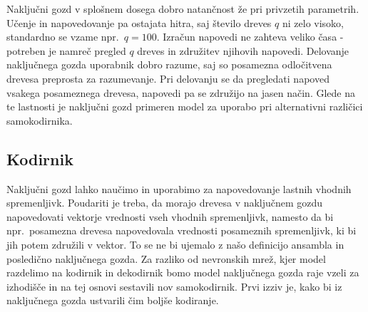 \documentclass[12pt,a4paper,twoside]{article}
\theoremstyle{definition} %
\theoremstyle{plain} %
\numberwithin{equation}{section}  %
\begin{document}


Naključni gozd v splošnem dosega dobro natančnost že pri privzetih parametrih. 
Učenje in napovedovanje pa ostajata hitra, saj število dreves $q$ ni zelo visoko, standardno se vzame npr.\ $q = 100$. 
Izračun napovedi ne zahteva veliko časa - potreben je namreč pregled $q$ dreves in združitev njihovih napovedi. 
Delovanje naključnega gozda uporabnik dobro razume, saj so posamezna odločitvena drevesa preprosta za razumevanje.
Pri delovanju se da pregledati napoved vsakega posameznega drevesa, napovedi pa se združijo na jasen način. 
Glede na te lastnosti je naključni gozd primeren model za uporabo pri alternativni različici samokodirnika.



\subsection{Kodirnik}

Naključni gozd lahko naučimo in uporabimo za napovedovanje lastnih vhodnih spremenljivk. 
Poudariti je treba, da morajo drevesa v naključnem gozdu napovedovati vektorje vrednosti vseh vhodnih spremenljivk, namesto da bi npr.\ posamezna drevesa napovedovala vrednosti posameznih spremenljivk, ki bi jih potem združili v vektor.
To se ne bi ujemalo z našo definicijo ansambla in posledično naključnega gozda.
Za razliko od nevronskih mrež, kjer model razdelimo na kodirnik in dekodirnik bomo model naključnega gozda raje vzeli za izhodišče in na tej osnovi sestavili nov samokodirnik. 
Prvi izziv je, kako bi iz naključnega gozda ustvarili čim boljše kodiranje.
\end{document}
